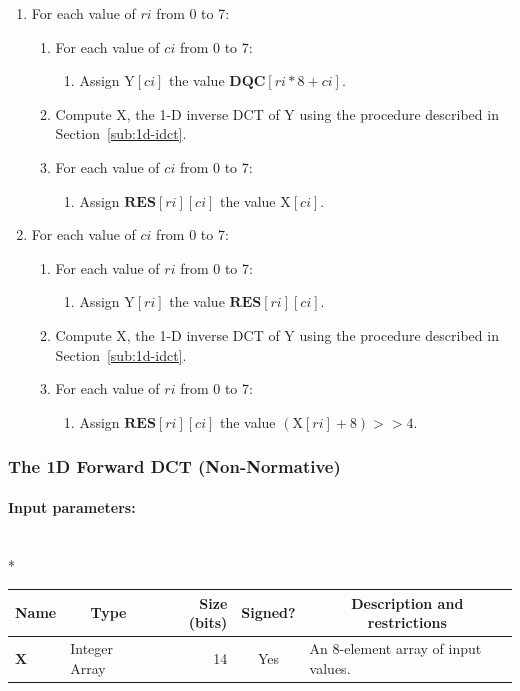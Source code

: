\documentclass[9pt,letterpaper]{book}
\newcommand{\idx}[1]{{\ensuremath{\mathit{#1}}}}
\newcommand{\ci}{\idx{ci}}
\newcommand{\ri}{\idx{ri}}
\newcommand{\bitvar}[1]{\ensuremath{\mathbf{\bm{#1}}}}
\newcommand{\locvar}[1]{\ensuremath{\mathrm{#1}}}
\numberwithin{equation}{chapter}
\numberwithin{figure}{chapter}
\numberwithin{table}{chapter}
\begin{document}
\begin{enumerate}
\item
For each value of \locvar{\ri} from 0 to 7:
\begin{enumerate}
\item
For each value of \locvar{\ci} from 0 to 7:
\begin{enumerate}
\item
Assign $\locvar{Y}[\locvar{\ci}]$ the value
 $\bitvar{DQC}[\locvar{\ri}*8+\locvar{\ci}]$.
\end{enumerate}
\item
Compute \locvar{X}, the 1-D inverse DCT of \locvar{Y} using the procedure
 described in Section~\ref{sub:1d-idct}.
\item
For each value of $\locvar{\ci}$ from 0 to 7:
\begin{enumerate}
\item
Assign $\bitvar{RES}[\locvar{\ri}][\locvar{\ci}]$ the value
 $\locvar{X}[\locvar{\ci}]$.
\end{enumerate}
\end{enumerate}
\item
For each value of \locvar{\ci} from 0 to 7:
\begin{enumerate}
\item
For each value of \locvar{\ri} from 0 to 7:
\begin{enumerate}
\item
Assign $\locvar{Y}[\locvar{\ri}]$ the value
 $\bitvar{RES}[\locvar{\ri}][\locvar{\ci}]$.
\end{enumerate}
\item
Compute \locvar{X}, the 1-D inverse DCT of \locvar{Y} using the procedure
 described in Section~\ref{sub:1d-idct}.
\item
For each value of \locvar{\ri} from 0 to 7:
\begin{enumerate}
\item
Assign $\bitvar{RES}[\locvar{\ri}][\locvar{\ci}]$ the value
 $(\locvar{X}[\locvar{\ri}]+8)>>4$.
\end{enumerate}
\end{enumerate}
\end{enumerate}

\subsubsection{The 1D Forward DCT (Non-Normative)}

\paragraph{Input parameters:}\hfill\\*
\begin{tabularx}{\textwidth}{@{}llrcX@{}}\toprule
\multicolumn{1}{c}{Name} &
\multicolumn{1}{c}{Type} &
\multicolumn{1}{p{30pt}}{\centering Size (bits)} &
\multicolumn{1}{c}{Signed?} &
\multicolumn{1}{c}{Description and restrictions} \\\midrule\endhead
\bitvar{X}        & \multicolumn{1}{p{40pt}}{Integer Array} &
                              14 & Yes & An 8-element array of input values. \\
\bottomrule\end{tabularx}
\end{document}

